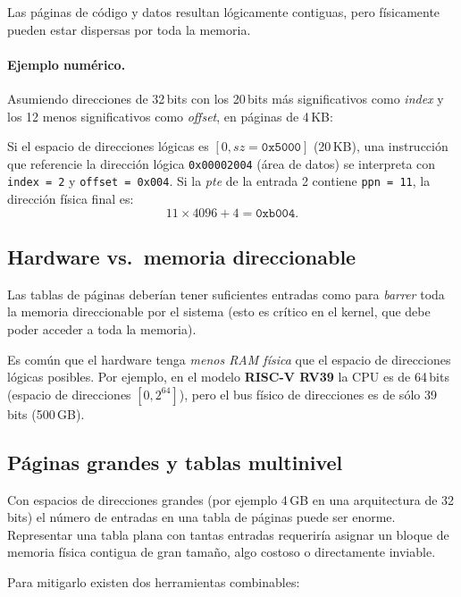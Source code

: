 \documentclass[11pt,a4paper]{article}
\begin{document}
Las páginas de código y datos resultan lógicamente contiguas, pero
físicamente pueden estar dispersas por toda la memoria.

\paragraph{Ejemplo numérico.}
Asumiendo direcciones de 32\,bits con los 20\,bits más significativos
como \emph{index} y los 12 menos significativos como \emph{offset}, en
páginas de 4\,KB:

Si el espacio de direcciones lógicas es $[0, sz = \texttt{0x5000}]$
(20\,KB), una instrucción que referencie la dirección lógica
\texttt{0x00002004} (área de datos) se interpreta con
\texttt{index = 2} y \texttt{offset = 0x004}. Si la \emph{pte} de la
entrada 2 contiene \texttt{ppn = 11}, la dirección física final es:
\[
11 \times 4096 + 4 = \texttt{0xb004}.
\]

\subsection{Hardware vs.\ memoria direccionable}

Las tablas de páginas deberían tener suficientes entradas como para
\emph{barrer} toda la memoria direccionable por el sistema (esto es
crítico en el kernel, que debe poder acceder a toda la memoria).

\begin{importante}
Es común que el hardware tenga \emph{menos RAM física} que el espacio de
direcciones lógicas posibles. Por ejemplo, en el modelo
\textbf{RISC-V RV39} la CPU es de 64\,bits (espacio de direcciones
$[0, 2^{64}]$), pero el bus físico de direcciones es de sólo 39\,bits
(500\,GB).
\end{importante}

\subsection{Páginas grandes y tablas multinivel}

Con espacios de direcciones grandes (por ejemplo 4\,GB en una
arquitectura de 32\,bits) el número de entradas en una tabla de páginas
puede ser enorme. Representar una tabla plana con tantas entradas
requeriría asignar un bloque de memoria física contigua de gran tamaño,
algo costoso o directamente inviable.

Para mitigarlo existen dos herramientas combinables:
\end{document}
